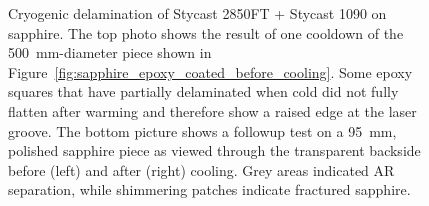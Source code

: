 \begin{figure}[!t]
    \centering
    \hfill
    \caption[Photos of cryogenic delamination of Stycast 2850FT + Stycast 1090 on sapphire.]{Cryogenic delamination of Stycast 2850FT + Stycast 1090 on sapphire. The top photo shows the result of one cooldown of the 500~mm-diameter piece shown in Figure~\ref{fig:sapphire_epoxy_coated_before_cooling}. Some epoxy squares that have partially delaminated when cold did not fully flatten after warming and therefore show a raised edge at the laser groove. The bottom picture shows a followup test on a 95~mm, polished sapphire piece as viewed through the transparent backside before (left) and after (right) cooling. Grey areas indicated AR separation, while shimmering patches indicate fractured sapphire.}
    \label{fig:epoxy_delamination}
\end{figure}

